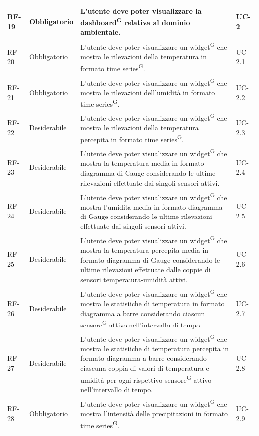 \documentclass[8pt]{article}
\newcommand{\glossterm}[1]{#1\textsuperscript{G}} %
\begin{document}
\begin{longtable}{|>{\centering\arraybackslash}p{1.2cm}|>{\centering\arraybackslash}p{2cm}|>{\centering\arraybackslash}p{8.5cm}|>{\centering\arraybackslash}p{3cm}|}
            RF-19 & Obbligatorio & L'utente deve poter visualizzare la \glossterm{dashboard} relativa al dominio ambientale. & UC-2 \\ \hline
            RF-20 & Obbligatorio & L'utente deve poter visualizzare un \glossterm{widget} che mostra le rilevazioni della temperatura in formato \glossterm{time series}. & UC-2.1 \\ \hline
            RF-21 & Obbligatorio & L'utente deve poter visualizzare un \glossterm{widget} che mostra le rilevazioni dell'umidità in formato \glossterm{time series}. & UC-2.2 \\ \hline
            RF-22 & Desiderabile & L'utente deve poter visualizzare un \glossterm{widget} che mostra le rilevazioni della temperatura percepita in formato \glossterm{time series}. & UC-2.3 \\ \hline
            RF-23 & Desiderabile & L'utente deve poter visualizzare un \glossterm{widget} che mostra la temperatura media in formato diagramma di Gauge considerando le ultime rilevazioni effettuate dai singoli sensori attivi. & UC-2.4 \\ \hline
            RF-24 & Desiderabile & L'utente deve poter visualizzare un \glossterm{widget} che mostra l'umidità media in formato diagramma di Gauge considerando le ultime rilevazioni effettuate dai singoli sensori attivi. & UC-2.5 \\ \hline
            RF-25 & Desiderabile & L'utente deve poter visualizzare un \glossterm{widget} che mostra la temperatura percepita media in formato diagramma di Gauge considerando le ultime rilevazioni effettuate dalle coppie di sensori temperatura-umidità attivi. & UC-2.6 \\ \hline
            RF-26 & Desiderabile & L'utente deve poter visualizzare un \glossterm{widget} che mostra le statistiche di temperatura in formato diagramma a barre considerando ciascun \glossterm{sensore} attivo nell'intervallo di tempo. & UC-2.7 \\ \hline
            RF-27 & Desiderabile & L'utente deve poter visualizzare un \glossterm{widget} che mostra le statistiche di temperatura percepita in formato diagramma a barre considerando ciascuna coppia di valori di temperatura e umidità per ogni rispettivo \glossterm{sensore} attivo nell'intervallo di tempo. & UC-2.8 \\ \hline
            RF-28 & Obbligatorio & L'utente deve poter visualizzare un \glossterm{widget} che mostra l'intensità delle precipitazioni in formato \glossterm{time series}. & UC-2.9 \\ \hline

\end{longtable}
\end{document}
